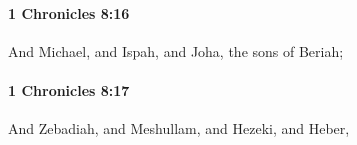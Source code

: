 		\paragraph{1 Chronicles 8:16} %
			\label{1CHRONICLES-8-16}

			And Michael, and Ispah, and Joha, the sons of Beriah;


		\paragraph{1 Chronicles 8:17} %
			\label{1CHRONICLES-8-17}

			And Zebadiah, and Meshullam, and Hezeki, and Heber,



